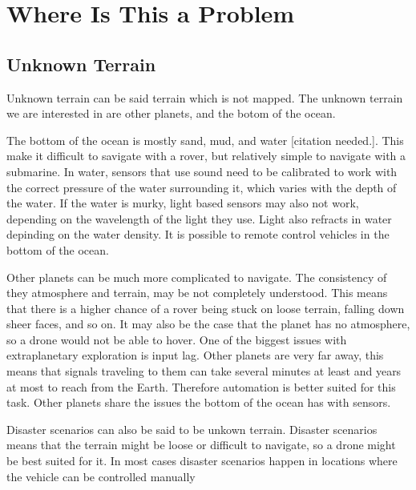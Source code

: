 \section{Where Is This a Problem}

\subsection{Unknown Terrain}
    Unknown terrain can be said terrain which is not mapped. The unknown terrain we are interested in are other planets, and the botom of the ocean.
    
    The bottom of the ocean is mostly sand, mud, and water [citation needed.]. This make it difficult to savigate with a rover, but relatively simple to navigate with a submarine. In water, sensors that use sound need to be calibrated to work with the correct pressure of the water surrounding it, which varies with the depth of the water. If the water is murky, light based sensors may also not work, depending on the wavelength of the light they use. Light also refracts in water depinding on the water density. It is possible to remote control vehicles in the bottom of the ocean.

    Other planets can be much more complicated to navigate. The consistency of they atmosphere and terrain, may be not completely understood. This means that there is a higher chance of a rover being stuck on loose terrain, falling down sheer faces, and so on. It may also be the case that the planet has no atmosphere, so a drone would not be able to hover. One of the biggest issues with extraplanetary exploration is input lag. Other planets are very far away, this means that signals traveling to them can take several minutes at least and years at most to reach from the Earth. Therefore automation is better suited for this task. Other planets share the issues the bottom of the ocean has with sensors.

    Disaster scenarios can also be said to be unkown terrain. Disaster scenarios means that the terrain might be loose or difficult to navigate, so a drone might be best suited for it. In most cases disaster scenarios happen in locations where the vehicle can be controlled manually
